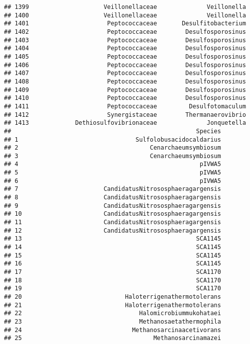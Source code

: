 \documentclass[
]{article}
\begin{document}
\begin{verbatim}
## 1399                     Veillonellaceae              Veillonella
## 1400                     Veillonellaceae              Veillonella
## 1401                      Peptococcaceae       Desulfitobacterium
## 1402                      Peptococcaceae        Desulfosporosinus
## 1403                      Peptococcaceae        Desulfosporosinus
## 1404                      Peptococcaceae        Desulfosporosinus
## 1405                      Peptococcaceae        Desulfosporosinus
## 1406                      Peptococcaceae        Desulfosporosinus
## 1407                      Peptococcaceae        Desulfosporosinus
## 1408                      Peptococcaceae        Desulfosporosinus
## 1409                      Peptococcaceae        Desulfosporosinus
## 1410                      Peptococcaceae        Desulfosporosinus
## 1411                      Peptococcaceae         Desulfotomaculum
## 1412                      Synergistaceae        Thermanaerovibrio
## 1413             Dethiosulfovibrionaceae              Jonquetella
##                                                    Species
## 1                                 Sulfolobusacidocaldarius
## 2                                     Cenarchaeumsymbiosum
## 3                                     Cenarchaeumsymbiosum
## 4                                                   pIVWA5
## 5                                                   pIVWA5
## 6                                                   pIVWA5
## 7                        CandidatusNitrososphaeragargensis
## 8                        CandidatusNitrososphaeragargensis
## 9                        CandidatusNitrososphaeragargensis
## 10                       CandidatusNitrososphaeragargensis
## 11                       CandidatusNitrososphaeragargensis
## 12                       CandidatusNitrososphaeragargensis
## 13                                                 SCA1145
## 14                                                 SCA1145
## 15                                                 SCA1145
## 16                                                 SCA1145
## 17                                                 SCA1170
## 18                                                 SCA1170
## 19                                                 SCA1170
## 20                             Haloterrigenathermotolerans
## 21                             Haloterrigenathermotolerans
## 22                                 Halomicrobiummukohataei
## 23                                 Methanosaetathermophila
## 24                               Methanosarcinaacetivorans
## 25                                     Methanosarcinamazei

\end{verbatim}
\end{document}
